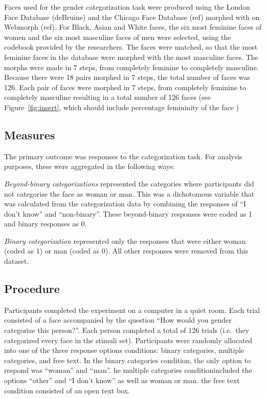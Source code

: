 \documentclass[
  man]{apa7}
\begin{document}
Faces used for the gender categorization task were produced using the London Face Database (deBruine) and the Chicago Face Database (ref) morphed with on Webmorph (ref). For Black, Asian and White faces, the six most feminine faces of women and the six most masculine faces of men were selected, using the codebook provided by the researchers. The faces were matched, so that the most feminine faces in the database were morphed with the most masculine faces. The morphs were made in 7 steps, from completely feminine to completely masculine. Because there were 18 pairs morphed in 7 steps, the total number of faces was 126. Each pair of faces were morphed in 7 steps, from completely feminine to completely masculine resulting in a total number of 126 faces (see Figure~\ref{fig:insert}, which should include percentage femininity of the face )

\hypertarget{measures}{%
\subsection{Measures}\label{measures}}

The primary outcome was responses to the categorization task. For analysis purposes, these were aggregated in the following ways:

\emph{Beyond-binary categorizations} represented the categories where participants did not categorise the face as woman or man. This was a dichotomous variable that was calculated from the categorization data by combining the responses of ``I don't know'' and ``non-binary''. These beyond-binary responses were coded as 1 and binary responses as 0.

\emph{Binary categorization} represented only the responses that were either woman (coded as 1) or man (coded as 0). All other responses were removed from this dataset.

\hypertarget{procedure}{%
\subsection{Procedure}\label{procedure}}

Participants completed the experiment on a computer in a quiet room. Each trial consisted of a face accompanied by the question ``How would you gender categorize this person?''. Each person completed a total of 126 trials (i.e.~they categorized every face in the stimuli set). Participants were randomly allocated into one of the three response options conditions: binary categories, multiple categories, and free text. In the binary categories condition, the only option to respond was ``woman'' and ``man''. he multiple categories conditionincluded the options ``other'' and ``I don't know'' as well as woman or man. the free text condition consisted of an open text box.
\end{document}
